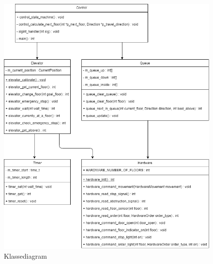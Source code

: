 \documentclass{article}
\begin{document}
\begin{figure}[hp]
  \centering
  \advance\leftskip-1cm
  \includegraphics[width=430]{rapport/klassediagram.png}
  \caption{Klassediagram}
  \label{fig:KlasseDia}
\end{figure}
\end{document}
